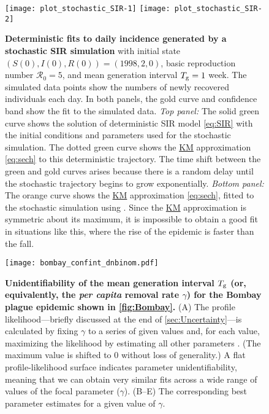 \documentclass[]{interact}\usepackage[]{graphicx}\usepackage[]{xcolor}
\newenvironment{knitrout}{}{} %
\theoremstyle{plain}%
\theoremstyle{definition}
\theoremstyle{remark}
\newcommand{\R}{{\mathcal R}}
\newcommand{\Rn}{\R_0}
\newcommand{\Tg}{T_{\rm g}}
\newcommand{\KM}{\protect\hyperlink{cite.KermMcKe27}{KM}\xspace}
\newcommand{\code}[1]{\texttt{\detokenize{#1}}}
\newcommand{\nlscol}{orange\xspace}  %
\newcommand{\FOnbcol}{gold\xspace}
\newcommand{\determcol}{green\xspace}
\newcommand{\Sinit}{S(0)}
\newcommand{\Iinit}{I(0)}
\newcommand{\Rinit}{R(0)}
\begin{document}
\begin{figure}
\begin{knitrout}
\color{fgcolor}
\texttt{[image: plot\_stochastic\_SIR-1]} 
\texttt{[image: plot\_stochastic\_SIR-2]} 
\end{knitrout}
  \caption{\textbf{Deterministic fits to daily incidence generated by a
      stochastic SIR simulation} with initial state
    $(\Sinit,\Iinit,\Rinit)=(1998,2,0)$, basic reproduction number $\Rn=5$, and
    mean generation interval $\Tg=1$ week.
    The simulated data points show the numbers of newly recovered
    individuals each day.
    In both panels, the \FOnbcol curve and confidence band show the
    \code{fitode} fit to the simulated data.  \emph{Top panel:} The
    solid \determcol curve shows the solution of deterministic SIR model
    \eqref{eq:SIR} with the initial conditions and parameters used for
    the stochastic simulation.  The dotted \determcol curve shows the \KM
    approximation \eqref{eq:sech} to this deterministic trajectory.  The
    time shift between the \determcol and \FOnbcol curves arises because there
    is a random delay until the stochastic trajectory begins to grow
    exponentially.
    \emph{Bottom panel:} The \nlscol curve shows the \KM approximation
    \eqref{eq:sech}, fitted to the stochastic simulation using \code{nls}.
    Since the \KM approximation is symmetric about its maximum, it is
    impossible to obtain a good fit in situations like this, where
    the rise of the epidemic is faster than the fall.
  }\label{fig:stoch}
\end{figure}

\pagebreak

\begin{figure}[!h]
  \texttt{[image: bombay\_confint\_dnbinom.pdf]}
  \caption{\textbf{Unidentifiability of the mean generation interval
      $\Tg$ (or, equivalently, the \emph{per capita} removal rate $\gamma$) for the Bombay
      plague epidemic shown in \cref{fig:Bombay}.}
    (\textsf{A}) The profile likelihood---briefly discussed at the end
    of \cref{sec:Uncertainty}---is calculated by fixing $\gamma$ to a
    series of given values and, for each value,
    maximizing the likelihood by estimating all other
    parameters \citep{Bolk08}. (The maximum value is shifted to 0
    without loss of generality.) A flat profile-likelihood surface
    indicates parameter unidentifiability, meaning that we can obtain
    very similar fits across a wide range of values
    of the focal parameter ($\gamma$).  (\textsf{B--E}) The
    corresponding best parameter estimates for a given value of
    $\gamma$.}\label{fig:proflikgamma}
\end{figure}
\end{document}
